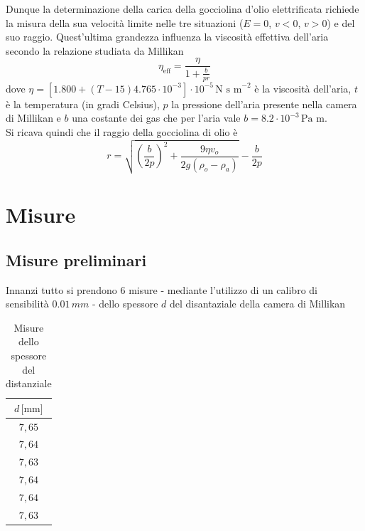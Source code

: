 \documentclass[]{article}
\let\oldsection\section%
\renewcommand{\section}{%
	\renewcommand{\theequation}{\thesection.\arabic{equation}}%
	\oldsection}%
\let\oldsubsection\subsection%
\renewcommand{\subsection}{%
	\renewcommand{\theequation}{\thesubsection.\arabic{equation}}%
	\oldsubsection}%
\begin{document}
    Dunque la determinazione della carica della gocciolina d'olio elettrificata richiede la misura della sua velocità limite nelle tre situazioni ($E=0$, $v<0$, $v>0$) e del suo raggio. Quest'ultima grandezza influenza la viscosità effettiva dell'aria secondo la relazione studiata da Millikan
    \begin{equation}
        \label{eta_eff}
        \eta_{\text{eff}}=\frac{\eta}{1 + \frac{b}{p r}}
    \end{equation}
    dove $\displaystyle \eta = \left[1.800 + (T -15)4.765 \cdot 10^{-3} \right] \cdot 10^{-5} \,\text{N s m}^{-2}$ è la viscosità dell'aria, $t$ è la temperatura (in gradi Celsius), $p$ la pressione dell'aria presente nella camera di Millikan e $b$ una costante dei gas che per l'aria vale $b=8.2 \cdot 10^{-3} \, \text{Pa m}$.\\ Si ricava quindi che il raggio della gocciolina di olio è 
    \begin{equation}
        \label{raggio-def}
        r=\sqrt{\left( \frac{b}{2p} \right) ^2 + \frac{9 \eta v_o}{2 g \left(\rho_o - \rho_a \right)}} - \frac{b}{2p}
    \end{equation}


    \section{Misure}

    \subsection{Misure preliminari}
    \label{par:misure-preliminari}

    Innanzi tutto si prendono 6 misure - mediante l'utilizzo di un calibro di sensibilità $ 0.01\, mm $ - dello spessore $ d $ del disantaziale della camera di Millikan

    \begin{table}[H]
        \centering
    
        \begin{tabular}{||c||}
            \hline
            $d\, \text{[mm]} $ \\
            \hline\hline
    
            $ 7,65 $ \\\hline
            $ 7,64 $ \\\hline
            $ 7,63 $ \\\hline
            $ 7,64 $ \\\hline
            $ 7,64 $ \\\hline
            $ 7,63 $ \\\hline

        
        \end{tabular}
        \caption{Misure dello spessore del distanziale}
        \label{distanziale}
    \end{table}
\end{document}
